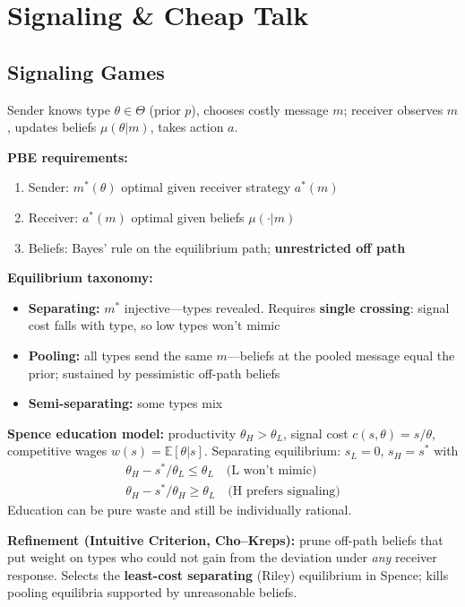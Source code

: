 \section{Signaling \& Cheap Talk}

\subsection{Signaling Games}
Sender knows type \(\theta \in \Theta\) (prior \(p\)), chooses costly message \(m\); receiver observes \(m\), updates beliefs \(\mu(\theta|m)\), takes action \(a\).

\textbf{PBE requirements:}
\begin{enumerate}[nosep]
    \item Sender: \(m^*(\theta)\) optimal given receiver strategy \(a^*(m)\)
    \item Receiver: \(a^*(m)\) optimal given beliefs \(\mu(\cdot|m)\)
    \item Beliefs: Bayes' rule on the equilibrium path; \textbf{unrestricted off path}
\end{enumerate}

\textbf{Equilibrium taxonomy:}
\begin{itemize}[nosep]
    \item \textbf{Separating:} \(m^*\) injective---types revealed. Requires \textbf{single crossing}: signal cost falls with type, so low types won't mimic
    \item \textbf{Pooling:} all types send the same \(m\)---beliefs at the pooled message equal the prior; sustained by pessimistic off-path beliefs
    \item \textbf{Semi-separating:} some types mix
\end{itemize}

\textbf{Spence education model:} productivity \(\theta_H > \theta_L\), signal cost \(c(s,\theta) = s/\theta\), competitive wages \(w(s) = \mathbb{E}[\theta|s]\). Separating equilibrium: \(s_L = 0\), \(s_H = s^*\) with
\begin{gather*}
\theta_H - s^*/\theta_L \leq \theta_L \quad \text{(L won't mimic)} \\
\theta_H - s^*/\theta_H \geq \theta_L \quad \text{(H prefers signaling)}
\end{gather*}
Education can be pure waste and still be individually rational.

\textbf{Refinement (Intuitive Criterion, Cho--Kreps):} prune off-path beliefs that put weight on types who could not gain from the deviation under \textit{any} receiver response. Selects the \textbf{least-cost separating} (Riley) equilibrium in Spence; kills pooling equilibria supported by unreasonable beliefs.

